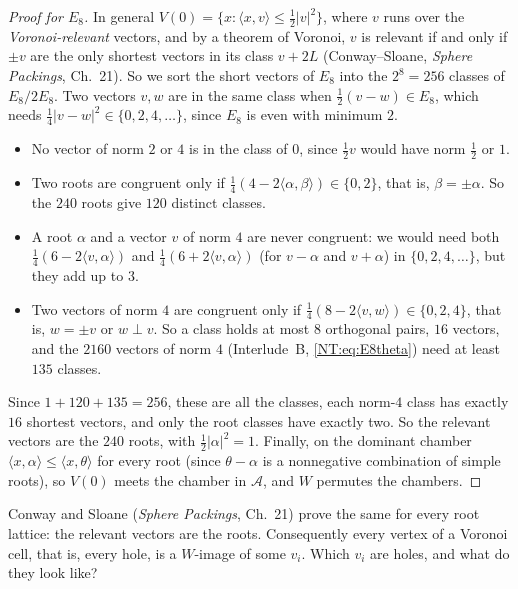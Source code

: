 \documentclass[11pt,openany]{book}
\theoremstyle{plain}
\theoremstyle{definition}
\theoremstyle{remark}
\newcommand{\abs}[1]{\left\lvert #1 \right\rvert}
\newcommand{\ip}[2]{\langle #1, #2\rangle}
\begin{document}
\begin{proof}[Proof for $E_8$]
In general $V(0)=\{x:\ip xv\le\frac12\abs v^2\}$, where $v$ runs over the \emph{Voronoi-relevant} vectors,
and by a theorem of Voronoi, $v$ is relevant if and only if $\pm v$ are the only shortest vectors in its
class $v+2L$ (Conway--Sloane, \emph{Sphere Packings}, Ch.~21). So we sort the short vectors of $E_8$ into
the $2^8=256$ classes of $E_8/2E_8$. Two vectors $v,w$ are in the same class when $\frac12(v-w)\in E_8$,
which needs $\frac14\abs{v-w}^2\in\{0,2,4,\dots\}$, since $E_8$ is even with minimum $2$.
\begin{itemize}[nosep]
\item No vector of norm $2$ or $4$ is in the class of $0$, since $\frac12v$ would have norm $\frac12$ or $1$.
\item Two roots are congruent only if $\frac14(4-2\ip\alpha\beta)\in\{0,2\}$, that is, $\beta=\pm\alpha$. So the
  $240$ roots give $120$ distinct classes.
\item A root $\alpha$ and a vector $v$ of norm $4$ are never congruent: we would need both
  $\frac14(6-2\ip v\alpha)$ and $\frac14(6+2\ip v\alpha)$ (for $v-\alpha$ and $v+\alpha$) in $\{0,2,4,\dots\}$, but
  they add up to $3$.
\item Two vectors of norm $4$ are congruent only if $\frac14(8-2\ip vw)\in\{0,2,4\}$, that is, $w=\pm v$ or
  $w\perp v$. So a class holds at most $8$ orthogonal pairs, $16$ vectors, and the $2160$ vectors of norm
  $4$ (Interlude~B, \eqref{NT:eq:E8theta}) need at least $135$ classes.
\end{itemize}
Since $1+120+135=256$, these are all the classes, each norm-$4$ class has exactly $16$ shortest vectors,
and only the root classes have exactly two. So the relevant vectors are the $240$ roots, with
$\frac12\abs\alpha^2=1$. Finally, on the dominant chamber $\ip x\alpha\le\ip x\theta$ for every root
(since $\theta-\alpha$ is a nonnegative combination of simple roots), so $V(0)$ meets the chamber in
$\mathcal A$, and $W$ permutes the chambers.
\end{proof}

Conway and Sloane (\emph{Sphere Packings}, Ch.~21) prove the same for every root lattice: the relevant
vectors are the roots. Consequently every vertex of a Voronoi cell, that is, every hole, is a $W$-image of
some $v_i$. Which $v_i$ are holes, and what do they look like?
\end{document}
